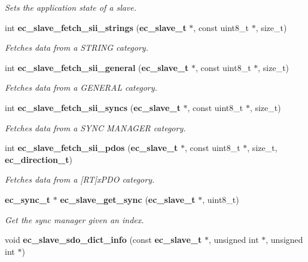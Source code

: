 \begin{DoxyCompactItemize}
\begin{DoxyCompactList}\small\item\em \-Sets the application state of a slave. \end{DoxyCompactList}\item 
int {\bf ec\-\_\-slave\-\_\-fetch\-\_\-sii\-\_\-strings} ({\bf ec\-\_\-slave\-\_\-t} $\ast$, const uint8\-\_\-t $\ast$, size\-\_\-t)
\begin{DoxyCompactList}\small\item\em \-Fetches data from a \-S\-T\-R\-I\-N\-G category. \end{DoxyCompactList}\item 
int {\bf ec\-\_\-slave\-\_\-fetch\-\_\-sii\-\_\-general} ({\bf ec\-\_\-slave\-\_\-t} $\ast$, const uint8\-\_\-t $\ast$, size\-\_\-t)
\begin{DoxyCompactList}\small\item\em \-Fetches data from a \-G\-E\-N\-E\-R\-A\-L category. \end{DoxyCompactList}\item 
int {\bf ec\-\_\-slave\-\_\-fetch\-\_\-sii\-\_\-syncs} ({\bf ec\-\_\-slave\-\_\-t} $\ast$, const uint8\-\_\-t $\ast$, size\-\_\-t)
\begin{DoxyCompactList}\small\item\em \-Fetches data from a \-S\-Y\-N\-C \-M\-A\-N\-A\-G\-E\-R category. \end{DoxyCompactList}\item 
int {\bf ec\-\_\-slave\-\_\-fetch\-\_\-sii\-\_\-pdos} ({\bf ec\-\_\-slave\-\_\-t} $\ast$, const uint8\-\_\-t $\ast$, size\-\_\-t, {\bf ec\-\_\-direction\-\_\-t})
\begin{DoxyCompactList}\small\item\em \-Fetches data from a [\-R\-T]x\-P\-D\-O category. \end{DoxyCompactList}\item 
{\bf ec\-\_\-sync\-\_\-t} $\ast$ {\bf ec\-\_\-slave\-\_\-get\-\_\-sync} ({\bf ec\-\_\-slave\-\_\-t} $\ast$, uint8\-\_\-t)
\begin{DoxyCompactList}\small\item\em \-Get the sync manager given an index. \end{DoxyCompactList}\item 
void {\bf ec\-\_\-slave\-\_\-sdo\-\_\-dict\-\_\-info} (const {\bf ec\-\_\-slave\-\_\-t} $\ast$, unsigned int $\ast$, unsigned int $\ast$)\label{slave_8h_a42809dba180f305491cc16c036c22f0a}


\end{DoxyCompactItemize}
